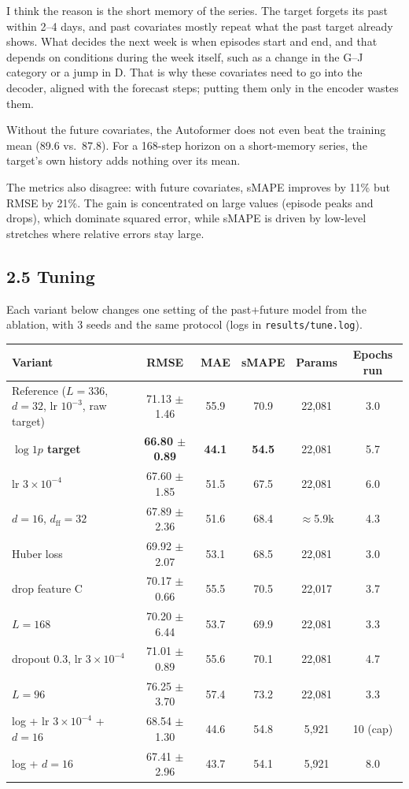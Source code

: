 \documentclass[11pt]{article}
\begin{document}
I think the reason is the short memory of the series. The target forgets its past within 2--4
days, and past covariates mostly repeat what the past target already shows. What decides the next
week is when episodes start and end, and that depends on conditions during the week itself, such
as a change in the G--J category or a jump in D. That is why these covariates need to go into the
decoder, aligned with the forecast steps; putting them only in the encoder wastes them.

Without the future covariates, the Autoformer does not even beat the training mean (89.6 vs.\ 87.8).
For a 168-step horizon on a short-memory series, the target's own history adds nothing over its
mean.

The metrics also disagree: with future covariates, sMAPE improves by 11\% but RMSE by 21\%. The
gain is concentrated on large values (episode peaks and drops), which dominate squared error, while
sMAPE is driven by low-level stretches where relative errors stay large.

\subsection*{2.5 Tuning}
Each variant below changes one setting of the past+future model from the ablation, with 3 seeds
and the same protocol (logs in \texttt{results/tune.log}).
\begin{center}\small
\begin{tabular}{lccccc}\toprule
Variant & RMSE & MAE & sMAPE & Params & Epochs run\\\midrule
Reference ($L{=}336$, $d{=}32$, lr $10^{-3}$, raw target) & 71.13 $\pm$ 1.46 & 55.9 & 70.9 & 22{,}081 & 3.0\\
\textbf{$\log1p$ target} & \textbf{66.80 $\pm$ 0.89} & \textbf{44.1} & \textbf{54.5} & 22{,}081 & 5.7\\
lr $3{\times}10^{-4}$     & 67.60 $\pm$ 1.85 & 51.5 & 67.5 & 22{,}081 & 6.0\\
$d{=}16$, $d_\text{ff}{=}32$ & 67.89 $\pm$ 2.36 & 51.6 & 68.4 & $\approx$5.9k & 4.3\\
Huber loss                & 69.92 $\pm$ 2.07 & 53.1 & 68.5 & 22{,}081 & 3.0\\
drop feature C            & 70.17 $\pm$ 0.66 & 55.5 & 70.5 & 22{,}017 & 3.7\\
$L{=}168$                 & 70.20 $\pm$ 6.44 & 53.7 & 69.9 & 22{,}081 & 3.3\\
dropout 0.3, lr $3{\times}10^{-4}$ & 71.01 $\pm$ 0.89 & 55.6 & 70.1 & 22{,}081 & 4.7\\
$L{=}96$                  & 76.25 $\pm$ 3.70 & 57.4 & 73.2 & 22{,}081 & 3.3\\\midrule
log + lr $3{\times}10^{-4}$ + $d{=}16$ & 68.54 $\pm$ 1.30 & 44.6 & 54.8 & 5{,}921 & 10 (cap)\\
log + $d{=}16$            & 67.41 $\pm$ 2.96 & 43.7 & 54.1 & 5{,}921 & 8.0\\\bottomrule
\end{tabular}\end{center}
\end{document}
